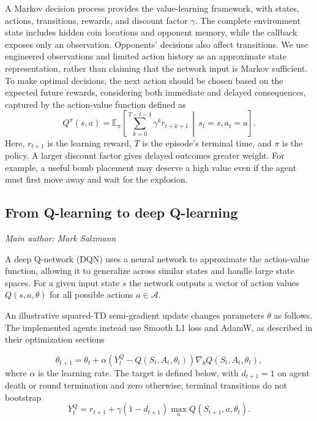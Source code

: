 \documentclass[11pt,a4paper]{article}
\newcommand{\contributionauthor}[1]{{\small\textit{Main author: #1}\par}}
\begin{document}
A Markov decision process provides the value-learning framework, with states,
actions, transitions, rewards, and discount factor $\gamma$. The complete
environment state includes hidden coin locations and opponent memory, while
the callback exposes only an observation. Opponents' decisions also affect
transitions. We use engineered observations and limited action history as
an approximate state representation, rather than claiming that the network
input is Markov sufficient.
To make optimal decisions, the next action should be chosen based on the expected future rewards, considering both immediate and delayed consequences, captured by the action-value function defined as
\begin{equation}
Q^\pi(s,a)=\mathbb{E}_{\pi}\!\left[
\sum_{k=0}^{T-t-1}\gamma^k r_{t+k+1}
\,\middle|\,s_t=s,a_t=a\right].
\end{equation}
Here, $r_{t+1}$ is the learning reward, $T$ is the episode's terminal time,
and $\pi$ is the policy. A larger discount factor gives delayed outcomes
greater weight. For example, a useful bomb placement may deserve a high value
even if the agent must first move away and wait for the explosion.

\subsection{From Q-learning to deep Q-learning}
\contributionauthor{Mark Salzmann}
A deep Q-network (DQN) uses a neural network to approximate the action-value function, allowing it to generalize across similar states and handle large state spaces. 
For a given input state $s$ the network outputs a vector of action values $Q(s,a,\theta)$ for all possible actions $a \in \mathcal{A}$.

An illustrative squared-TD semi-gradient update changes parameters $\theta$ as follows. The implemented agents instead use Smooth L1 loss and AdamW, as described in their optimization sections

\begin{equation}
    \theta_{t+1} = \theta_t + \alpha\left(Y^Q_t - Q(S_t, A_t, \theta_t)\right) \nabla_\theta Q(S_t, A_t, \theta_t), 
\end{equation}
where $\alpha$ is the learning rate. The target is defined below, with $d_{t+1}=1$ on agent death or round termination and zero otherwise; terminal transitions do not bootstrap
\begin{equation}
Y^Q_t = r_{t+1} + \gamma(1-d_{t+1}) \max_{a} Q(S_{t+1}, a, \theta_t).
\end{equation}
\end{document}
